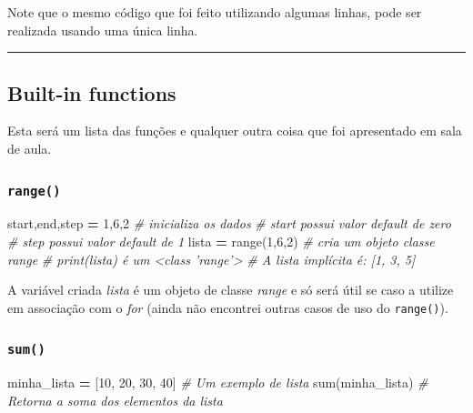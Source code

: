 \documentclass[]{book}
\newenvironment{Shaded}{\begin{snugshade}}{\end{snugshade}}
\newcommand{\DecValTok}[1]{\textcolor[rgb]{0.00,0.00,0.81}{#1}}
\newcommand{\CommentTok}[1]{\textcolor[rgb]{0.56,0.35,0.01}{\textit{#1}}}
\newcommand{\OperatorTok}[1]{\textcolor[rgb]{0.81,0.36,0.00}{\textbf{#1}}}
\newcommand{\BuiltInTok}[1]{#1}
\newcommand{\NormalTok}[1]{#1}
\begin{document}
Note que o mesmo código que foi feito utilizando algumas linhas, pode
ser realizada usando uma única linha.

\begin{center}\rule{0.5\linewidth}{\linethickness}\end{center}

\subsection{Built-in functions}\label{built-in-functions-1}

Esta será um lista das funções e qualquer outra coisa que foi
apresentado em sala de aula.

\subsubsection{\texorpdfstring{\texttt{range()}}{range()}}\label{range}

\begin{Shaded}
\begin{Highlighting}[]
\NormalTok{start,end,step }\OperatorTok{=} \DecValTok{1}\NormalTok{,}\DecValTok{6}\NormalTok{,}\DecValTok{2} \CommentTok{# inicializa os dados}
                            \CommentTok{# start possui valor default de zero}
                            \CommentTok{# step possui valor default de 1}
\NormalTok{lista }\OperatorTok{=} \BuiltInTok{range}\NormalTok{(}\DecValTok{1}\NormalTok{,}\DecValTok{6}\NormalTok{,}\DecValTok{2}\NormalTok{)   }\CommentTok{# cria um objeto classe range}
                            \CommentTok{# print(lista) é um <class 'range'>}
                             \CommentTok{# A lista implícita é: [1, 3, 5]}
\end{Highlighting}
\end{Shaded}

A variável criada \emph{lista} é um objeto de classe \emph{range} e só
será útil se caso a utilize em associação com o \emph{for} (ainda não
encontrei outras casos de uso do \texttt{range()}).

\subsubsection{\texorpdfstring{\texttt{sum()}}{sum()}}\label{sum}

\begin{Shaded}
\begin{Highlighting}[]
\NormalTok{minha_lista }\OperatorTok{=}\NormalTok{ [}\DecValTok{10}\NormalTok{, }\DecValTok{20}\NormalTok{, }\DecValTok{30}\NormalTok{, }\DecValTok{40}\NormalTok{] }\CommentTok{# Um exemplo de lista}
\BuiltInTok{sum}\NormalTok{(minha_lista)               }\CommentTok{# Retorna a soma dos elementos da lista}
\end{Highlighting}
\end{Shaded}
\end{document}
